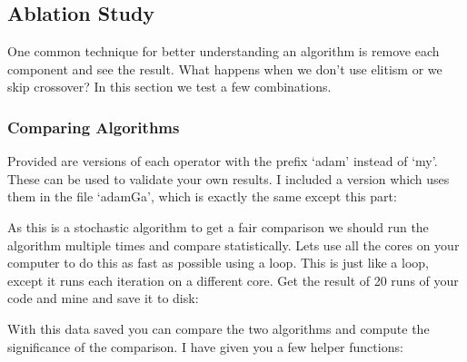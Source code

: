 \documentclass{article}
\begin{document}
\subsection{Ablation Study}
One common technique for better understanding an algorithm is remove each component and see the result. What happens when we don't use elitism or we skip crossover? In this section we test a few combinations. 

\subsubsection{Comparing Algorithms}
Provided are versions of each operator with the prefix `adam' instead of `my'. These can be used to validate your own results. I included a version which uses them in the file `adamGa', which is exactly the same except this part:

	

As this is a stochastic algorithm to get a fair comparison we should run the algorithm multiple times and compare statistically. Lets use all the cores on your computer to do this as fast as possible using a  loop. This is just like a  loop, except it runs each iteration on a different core. Get the result of 20 runs of your code and mine and save it to disk:

	

With this data saved you can compare the two algorithms and compute the significance of the comparison. I have given you a few helper functions:
	
	\newpage

	
\end{document}

